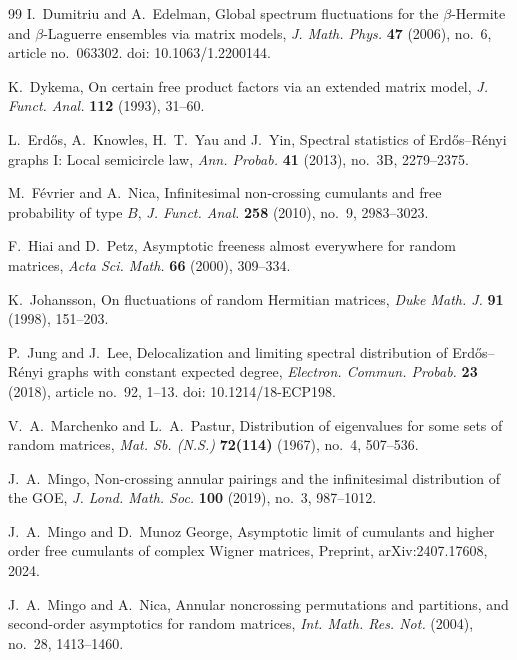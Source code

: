 \documentclass{article}
\theoremstyle{definition}
\begin{document}
{\begin{thebibliography}{99}
I.~Dumitriu and A.~Edelman,
\newblock Global spectrum fluctuations for the $\beta$-Hermite
and $\beta$-Laguerre ensembles via matrix models,
\newblock \emph{J. Math. Phys.}
\textbf{47} (2006), no.~6, article no.~063302.
\newblock doi: 10.1063/1.2200144.

K.~Dykema,
\newblock On certain free product factors via an extended matrix model,
\newblock \emph{J. Funct. Anal.}
\textbf{112} (1993), 31--60.

L.~Erd\H{o}s, A.~Knowles, H.~T.~Yau and J.~Yin,
\newblock Spectral statistics of Erd\H{o}s--R\'enyi graphs I:
Local semicircle law,
\newblock \emph{Ann. Probab.}
\textbf{41} (2013), no.~3B, 2279--2375.

M.~F\'evrier and A.~Nica,
\newblock Infinitesimal non-crossing cumulants and free probability
of type $B$,
\newblock \emph{J. Funct. Anal.}
\textbf{258} (2010), no.~9, 2983--3023.

F.~Hiai and D.~Petz,
\newblock Asymptotic freeness almost everywhere for random matrices,
\newblock \emph{Acta Sci. Math.}
\textbf{66} (2000), 309--334.

K.~Johansson,
\newblock On fluctuations of random Hermitian matrices,
\newblock \emph{Duke Math. J.}
\textbf{91} (1998), 151--203.

P.~Jung and J.~Lee,
\newblock Delocalization and limiting spectral distribution
of Erd\H{o}s--R\'enyi graphs with constant expected degree,
\newblock \emph{Electron. Commun. Probab.}
\textbf{23} (2018), article no.~92, 1--13.
\newblock doi: 10.1214/18-ECP198.

V.~A.~Marchenko and L.~A.~Pastur,
\newblock Distribution of eigenvalues for some sets of random matrices,
\newblock \emph{Mat. Sb. (N.S.)}
\textbf{72(114)} (1967), no.~4, 507--536.

J.~A.~Mingo,
\newblock Non-crossing annular pairings and the infinitesimal
distribution of the GOE,
\newblock \emph{J. Lond. Math. Soc.}
\textbf{100} (2019), no.~3, 987--1012.

J.~A.~Mingo and D.~Munoz George,
\newblock Asymptotic limit of cumulants and higher order free
cumulants of complex Wigner matrices,
\newblock Preprint, arXiv:2407.17608, 2024.

J.~A.~Mingo and A.~Nica,
\newblock Annular noncrossing permutations and partitions,
and second-order asymptotics for random matrices,
\newblock \emph{Int. Math. Res. Not.}
(2004), no.~28, 1413--1460.


\end{thebibliography}}
\end{document}
